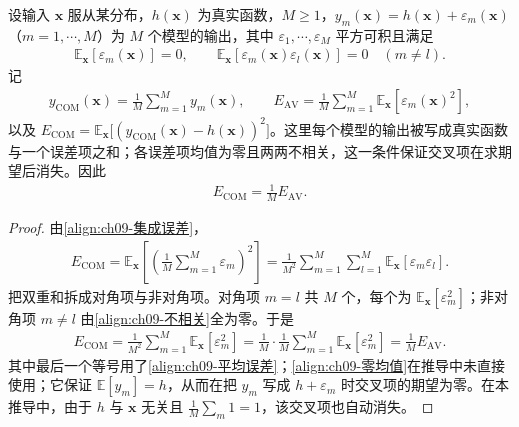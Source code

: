 \documentclass[../../main.tex]{subfiles}
\begin{document}
\begin{theorem}[集成误差的分解]\label{theorem:ch09-集成误差}
设输入 $\boldsymbol{x}$ 服从某分布，$h(\boldsymbol{x})$ 为真实函数，$M\geqslant1$，$y_{m}(\boldsymbol{x})=h(\boldsymbol{x})+\varepsilon_{m}(\boldsymbol{x})$（$m=1,\cdots,M$）为 $M$ 个模型的输出，其中 $\varepsilon_{1},\cdots,\varepsilon_{M}$ 平方可积且满足
\begin{align*}
\mathbb{E}_{\boldsymbol{x}}[\varepsilon_{m}(\boldsymbol{x})]=0,\qquad
\mathbb{E}_{\boldsymbol{x}}[\varepsilon_{m}(\boldsymbol{x})\varepsilon_{l}(\boldsymbol{x})]=0\quad(m\neq l).
\end{align*}
记
\begin{align*}
y_{\mathrm{COM}}(\boldsymbol{x})=\frac{1}{M}\sum_{m=1}^{M}y_{m}(\boldsymbol{x}),\qquad
E_{\mathrm{AV}}=\frac{1}{M}\sum_{m=1}^{M}\mathbb{E}_{\boldsymbol{x}}[\varepsilon_{m}(\boldsymbol{x})^{2}],
\end{align*}
以及 $E_{\mathrm{COM}}=\mathbb{E}_{\boldsymbol{x}}\bigl[(y_{\mathrm{COM}}(\boldsymbol{x})-h(\boldsymbol{x}))^{2}\bigr]$。这里每个模型的输出被写成真实函数与一个误差项之和；各误差项均值为零且两两不相关，这一条件保证交叉项在求期望后消失。因此
\begin{align}
E_{\mathrm{COM}}=\frac{1}{M}E_{\mathrm{AV}}.
\label{align:ch09-集成误差结果}
\end{align}
\end{theorem}

\begin{proof}
由\eqref{align:ch09-集成误差}，
\begin{align*}
E_{\mathrm{COM}}=\mathbb{E}_{\boldsymbol{x}}\!\left[\left(\frac{1}{M}\sum_{m=1}^{M}\varepsilon_{m}\right)^{2}\right]=\frac{1}{M^{2}}\sum_{m=1}^{M}\sum_{l=1}^{M}\mathbb{E}_{\boldsymbol{x}}[\varepsilon_{m}\varepsilon_{l}].
\end{align*}
把双重和拆成对角项与非对角项。对角项 $m=l$ 共 $M$ 个，每个为 $\mathbb{E}_{\boldsymbol{x}}[\varepsilon_{m}^{2}]$；非对角项 $m\neq l$ 由\eqref{align:ch09-不相关}全为零。于是
\begin{align*}
E_{\mathrm{COM}}=\frac{1}{M^{2}}\sum_{m=1}^{M}\mathbb{E}_{\boldsymbol{x}}[\varepsilon_{m}^{2}]=\frac{1}{M}\cdot\frac{1}{M}\sum_{m=1}^{M}\mathbb{E}_{\boldsymbol{x}}[\varepsilon_{m}^{2}]=\frac{1}{M}E_{\mathrm{AV}}.
\end{align*}
其中最后一个等号用了\eqref{align:ch09-平均误差}；\eqref{align:ch09-零均值}在推导中未直接使用；它保证 $\mathbb{E}[y_{m}]=h$，从而在把 $y_{m}$ 写成 $h+\varepsilon_{m}$ 时交叉项的期望为零。在本推导中，由于 $h$ 与 $\boldsymbol{x}$ 无关且 $\frac{1}{M}\sum_{m}1=1$，该交叉项也自动消失。
\end{proof}
\end{document}
